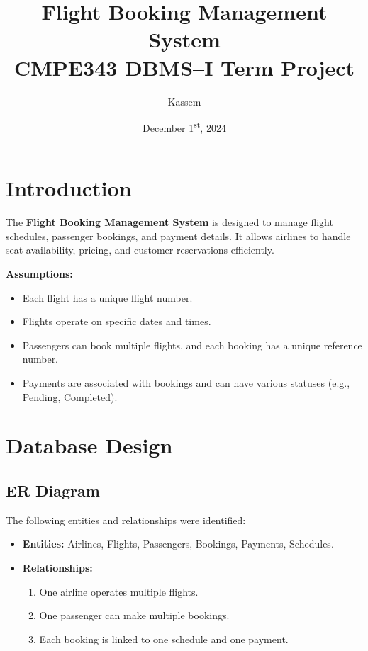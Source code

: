 \documentclass[14pt,a4paper]{extarticle}
\title{Flight Booking Management System\\\large CMPE343 DBMS--I Term Project}
\author{Kassem}
\date{December 1\textsuperscript{st}, 2024}
\begin{document}
\maketitle
\tableofcontents

\newpage

\section{Introduction}

The \textbf{Flight Booking Management System} is designed to manage flight schedules, passenger bookings, and payment details. It allows airlines to handle seat availability, pricing, and customer reservations efficiently.

\textbf{Assumptions:}
\begin{itemize}
    \item Each flight has a unique flight number.
    \item Flights operate on specific dates and times.
    \item Passengers can book multiple flights, and each booking has a unique reference number.
    \item Payments are associated with bookings and can have various statuses (e.g., Pending, Completed).
\end{itemize}

\section{Database Design}

\subsection{ER Diagram}
The following entities and relationships were identified:
\begin{itemize}
    \item \textbf{Entities:} Airlines, Flights, Passengers, Bookings, Payments, Schedules.
    \item \textbf{Relationships:}
        \begin{enumerate}
            \item One airline operates multiple flights.
            \item One passenger can make multiple bookings.
            \item Each booking is linked to one schedule and one payment.
        \end{enumerate}
\end{itemize}
\end{document}
